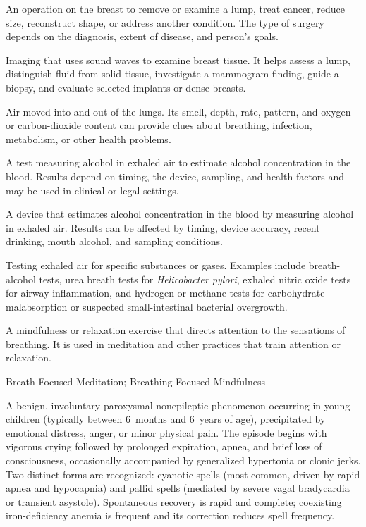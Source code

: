  An operation on the breast to remove or examine a lump, treat cancer, reduce size, reconstruct shape, or address another condition. The type of surgery depends on the diagnosis, extent of disease, and person's goals.

 Imaging that uses sound waves to examine breast tissue. It helps assess a lump, distinguish fluid from solid tissue, investigate a mammogram finding, guide a biopsy, and evaluate selected implants or dense breasts.

 Air moved into and out of the lungs. Its smell, depth, rate, pattern, and oxygen or carbon-dioxide content can provide clues about breathing, infection, metabolism, or other health problems.

 A test measuring alcohol in exhaled air to estimate alcohol concentration in the blood. Results depend on timing, the device, sampling, and health factors and may be used in clinical or legal settings.

 A device that estimates alcohol concentration in the blood by measuring alcohol in exhaled air. Results can be affected by timing, device accuracy, recent drinking, mouth alcohol, and sampling conditions.

 Testing exhaled air for specific substances or gases. Examples include breath-alcohol tests, urea breath tests for \textit{Helicobacter pylori}, exhaled nitric oxide tests for airway inflammation, and hydrogen or methane tests for carbohydrate malabsorption or suspected small-intestinal bacterial overgrowth.

 A mindfulness or relaxation exercise that directs
attention to the sensations of breathing. It is used in meditation and other
practices that train attention or relaxation.

\synonyms
Breath-Focused Meditation; Breathing-Focused Mindfulness

 A benign, involuntary paroxysmal nonepileptic phenomenon occurring in young children (typically between 6~months and 6~years of age), precipitated by emotional distress, anger, or minor physical pain. The episode begins with vigorous crying followed by prolonged expiration, apnea, and brief loss of consciousness, occasionally accompanied by generalized hypertonia or clonic jerks. Two distinct forms are recognized: cyanotic spells (most common, driven by rapid apnea and hypocapnia) and pallid spells (mediated by severe vagal bradycardia or transient asystole). Spontaneous recovery is rapid and complete; coexisting iron-deficiency anemia is frequent and its correction reduces spell frequency.

